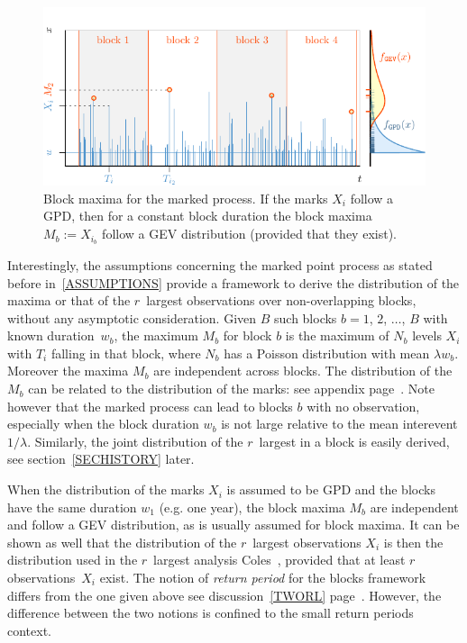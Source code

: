 \documentclass[a4paper]{report}
\begin{document}
\begin{figure}
  \centering
  \includegraphics[width=12cm]{images/RenouvAgc.pdf}
  \caption{\label{RenouvAg} Block maxima for the marked
    process. If the marks $X_i$ follow a GPD, then for a constant block duration
    the block maxima $M_b:=X_{i_b}$ follow a GEV distribution
    (provided that they exist).  
  }
\end{figure}

Interestingly, the assumptions concerning the marked point process as
stated before in~\ref{ASSUMPTIONS} provide a framework to derive the
distribution of the maxima or that of the $r$~largest observations
over non-overlapping blocks, without any asymptotic consideration.
Given $B$ such blocks $b=1$, $2$, $\dots$, $B$ with known duration~$w_b$, 
the maximum $M_b$ for block $b$ is the maximum of $N_b$ levels
$X_i$ with $T_i$ falling in that block, where $N_b$ has a Poisson
distribution with mean $\lambda w_b$.  Moreover the maxima $M_b$ are
independent across blocks. The distribution of the $M_b$ can be
related to the distribution of the marks: see appendix
page~\pageref{COMPOUND}.  Note however that the marked process can
lead to blocks $b$ with no observation, especially when the block
duration $w_b$ is not large relative to the mean interevent
$1/\lambda$.  Similarly, the joint distribution of the $r$~largest in
a block is easily derived, see section~\ref{SECHISTORY} later.

When the distribution of the marks $X_i$ is assumed to be GPD and the
blocks have the same duration $w_1$ (e.g. one year), the block maxima
$M_b$ are independent and follow a GEV distribution, as is usually
assumed for block maxima. It can be shown as well that the
distribution of the $r$~largest observations $X_i$ is then the distribution
used in the $r$~largest analysis Coles~\citep[chap.~3]{COLES},
provided that at least $r$ observations~$X_i$ exist. The notion of
\emph{return period} for the blocks framework differs from the one
given above see discussion~\ref{TWORL} page~\pageref{TWORL}.  However,
the difference between the two notions is confined to the small return
periods context.
\end{document}
